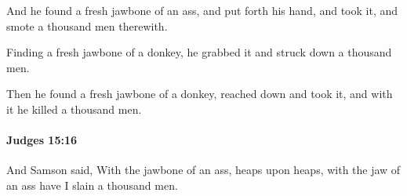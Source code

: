 			\begin{versebox}
					\item[BHS] 
					\item[ASV] And he found a fresh jawbone of an ass, and put forth his hand, and took it, and smote a thousand men therewith.
					\item[NIV] Finding a fresh jawbone of a donkey, he grabbed it and struck down a thousand men.
					\item[NRSV] Then he found a fresh jawbone of a donkey, reached down and took it, and with it he killed a thousand men.
			\end{versebox}

		\paragraph{Judges 15:16} %
			\label{JUDGES-15-16}

			And Samson said, With the jawbone of an ass, heaps upon heaps, with the jaw of an ass have I slain a thousand men.

